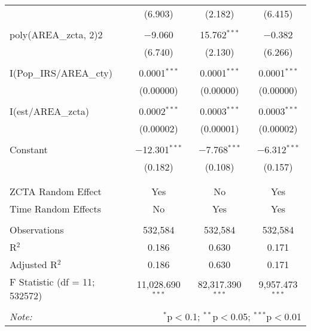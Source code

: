 \begin{table}[!htbp]
\begin{tabular}{@{\extracolsep{5pt}}lccc}
  & (6.903) & (2.182) & (6.415) \\ 
  & & & \\ 
 poly(AREA\_zcta, 2)2 & $-$9.060 & 15.762$^{***}$ & $-$0.382 \\ 
  & (6.740) & (2.130) & (6.266) \\ 
  & & & \\ 
 I(Pop\_IRS/AREA\_cty) & 0.0001$^{***}$ & 0.0001$^{***}$ & 0.0001$^{***}$ \\ 
  & (0.00000) & (0.00000) & (0.00000) \\ 
  & & & \\ 
 I(est/AREA\_zcta) & 0.0002$^{***}$ & 0.0003$^{***}$ & 0.0003$^{***}$ \\ 
  & (0.00002) & (0.00001) & (0.00002) \\ 
  & & & \\ 
 Constant & $-$12.301$^{***}$ & $-$7.768$^{***}$ & $-$6.312$^{***}$ \\ 
  & (0.182) & (0.108) & (0.157) \\ 
  & & & \\ 
\hline \\[-1.8ex] 
ZCTA Random Effect  & Yes & No & Yes \\
Time Random Effects & No & Yes & Yes \\
\hline \\[-1.8ex] 
Observations & 532,584 & 532,584 & 532,584 \\ 
R$^{2}$ & 0.186 & 0.630 & 0.171 \\ 
Adjusted R$^{2}$ & 0.186 & 0.630 & 0.171 \\ 
F Statistic (df = 11; 532572) & 11,028.690$^{***}$ & 82,317.390$^{***}$ & 9,957.473$^{***}$ \\ 
\hline 
\hline \\[-1.8ex] 
\textit{Note:}  & \multicolumn{3}{r}{$^{*}$p$<$0.1; $^{**}$p$<$0.05; $^{***}$p$<$0.01} \\ 
\end{tabular} 
\end{table} 
